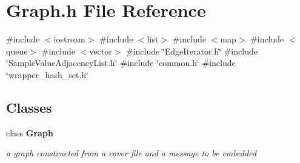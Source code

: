 \section{Graph.\+h File Reference}
\label{Graph_8h}
{\ttfamily \#include $<$iostream$>$}\newline
{\ttfamily \#include $<$list$>$}\newline
{\ttfamily \#include $<$map$>$}\newline
{\ttfamily \#include $<$queue$>$}\newline
{\ttfamily \#include $<$vector$>$}\newline
{\ttfamily \#include \char`\"{}Edge\+Iterator.\+h\char`\"{}}\newline
{\ttfamily \#include \char`\"{}Sample\+Value\+Adjacency\+List.\+h\char`\"{}}\newline
{\ttfamily \#include \char`\"{}common.\+h\char`\"{}}\newline
{\ttfamily \#include \char`\"{}wrapper\+\_\+hash\+\_\+set.\+h\char`\"{}}\newline
\subsection*{Classes}
\begin{DoxyCompactItemize}
\item 
class \textbf{ Graph}
\begin{DoxyCompactList}\small\item\em a graph constructed from a cover file and a message to be embedded \end{DoxyCompactList}\end{DoxyCompactItemize}
